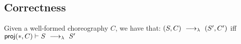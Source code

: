 



\subsection{Correctness}

\begin{theorem}[EPP]\label{thm:epp}
  Given a well-formed choreography $C$, we have that:
  $(S,C) \ \longrightarrow_{\lambda}\  (S', C')$ iff
  $\mathsf{proj} (*, C)\vdash S\ \longrightarrow_{\lambda}\  S'$
\end{theorem} 

